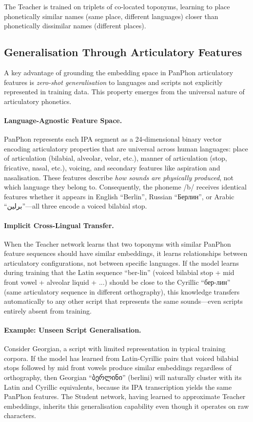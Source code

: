 \documentclass[11pt,a4paper]{article}
\newcommand{\textar}[1]{{\arabicfont #1}}
\begin{document}
The Teacher is trained on triplets of co-located toponyms, learning to place phonetically similar names (same place, different languages) closer than phonetically dissimilar names (different places).

\subsection{Generalisation Through Articulatory Features}
\label{subsec:panphon-generalisation}

A key advantage of grounding the embedding space in PanPhon articulatory features is \emph{zero-shot generalisation} to languages and scripts not explicitly represented in training data. This property emerges from the universal nature of articulatory phonetics.

\paragraph{Language-Agnostic Feature Space.} PanPhon represents each IPA segment as a 24-dimensional binary vector encoding articulatory properties that are universal across human languages: place of articulation (bilabial, alveolar, velar, etc.), manner of articulation (stop, fricative, nasal, etc.), voicing, and secondary features like aspiration and nasalisation. These features describe \emph{how sounds are physically produced}, not which language they belong to. Consequently, the phoneme /b/ receives identical features whether it appears in English ``Berlin'', Russian ``Берлин'', or Arabic ``\textar{برلين}''---all three encode a voiced bilabial stop.

\paragraph{Implicit Cross-Lingual Transfer.} When the Teacher network learns that two toponyms with similar PanPhon feature sequences should have similar embeddings, it learns relationships between articulatory configurations, not between specific languages. If the model learns during training that the Latin sequence ``ber-lin'' (voiced bilabial stop + mid front vowel + alveolar liquid + ...) should be close to the Cyrillic ``бер-лин'' (same articulatory sequence in different orthography), this knowledge transfers automatically to any other script that represents the same sounds---even scripts entirely absent from training.

\paragraph{Example: Unseen Script Generalisation.} Consider Georgian, a script with limited representation in typical training corpora. If the model has learned from Latin-Cyrillic pairs that voiced bilabial stops followed by mid front vowels produce similar embeddings regardless of orthography, then Georgian ``ბერლინი'' (berlini) will naturally cluster with its Latin and Cyrillic equivalents, because its IPA transcription yields the same PanPhon features. The Student network, having learned to approximate Teacher embeddings, inherits this generalisation capability even though it operates on raw characters.
\end{document}

